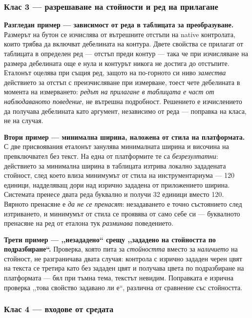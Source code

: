 \subsubsection{Клас 3 --- разрешаване на стойности и ред на прилагане}

\textbf{Разгледан пример --- зависимост от реда в таблицата за преобразуване.} Размерът на бутон се
изчислява от вътрешните отстъпи на native контролата, които трябва да включват дебелината на
контура. Двете свойства се прилагат от таблицата в определен ред --- отстъп преди контур --- така
че при изчисляване на размера дебелината още е нула и контурът никога не достига до отстъпите.
Еталонът оцелява при същия ред, защото на по-горното си ниво \emph{замества} действието за отстъп с
преизчисляване при измерване, тоест чете дебелината в момента на измерването: \emph{редът на
прилагане в таблицата е част от наблюдаваното поведение}, не вътрешна подробност. Решението е
изчислението да получава дебелината като аргумент, независимо от реда --- поправка на класа, не на
случая.

\textbf{Втори пример --- минимална ширина, наложена от стила на платформата.} С две присвоявания
еталонът занулява минималната ширина и височина на превключвател без текст. На една от
платформите те са \emph{безрезултатни}: действието за минимална ширина в таблицата изтрива локално
зададената стойност, след което влиза минимумът от стила на инструментариума --- 120 единици,
надделяващ дори над изрично зададена от приложението ширина. Системата пренесе двата реда буквално и
получи 32 единици вместо 120. Вярното пренасяне е \emph{да не се пренасят}: незадаването е точно
състоянието след изтриването, и минимумът от стила се проявява от само себе си --- буквалното
пренасяне на ред от еталона тук \emph{разминава} поведението.

\textbf{Трети пример --- ,,незададено“ срещу ,,зададено на стойността по подразбиране“.} Проверка,
която пита за \emph{стойността} вместо за \emph{наличието} на стойност, не разграничава двата
случая: контрола с изрично зададен черен цвят на текста се третира като без зададен цвят и получава
цвета по подразбиране на платформата --- бял при тъмна тема, текстът невидим. Поправката е изрична
проверка ,,това свойство задавано ли е“, различна от сравнение със стойността.

\subsubsection{Клас 4 --- входове от средата}

